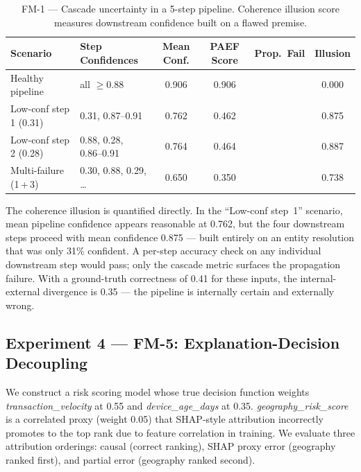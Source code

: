 \documentclass{article}
\newcommand{\yes}{\ding{51}}     %
\newcommand{\no}{\ding{55}}      %
\begin{document}
\begin{table}[t]
  \centering
  \caption{FM-1 --- Cascade uncertainty in a 5-step pipeline.  Coherence
    illusion score measures downstream confidence built on a flawed premise.}
  \label{tab:exp-fm1}
  \small
  \renewcommand{\arraystretch}{1.2}
  \begin{tabularx}{\textwidth}{lXcccc}
    \toprule
    \textbf{Scenario} & \textbf{Step Confidences} & \textbf{Mean Conf.} & \textbf{PAEF Score} & \textbf{Prop.\ Fail} & \textbf{Illusion} \\
    \midrule
    Healthy pipeline       & all $\geq 0.88$            & 0.906 & 0.906 & \no  & 0.000 \\
    Low-conf step 1 (0.31) & 0.31, 0.87--0.91           & 0.762 & 0.462 & \yes & 0.875 \\
    Low-conf step 2 (0.28) & 0.88, 0.28, 0.86--0.91     & 0.764 & 0.464 & \yes & 0.887 \\
    Multi-failure (1\,+\,3)& 0.30, 0.88, 0.29, \ldots   & 0.650 & 0.350 & \yes & 0.738 \\
    \bottomrule
  \end{tabularx}
\end{table}

The coherence illusion is quantified directly.  In the ``Low-conf step~1''
scenario, mean pipeline confidence appears reasonable at 0.762, but the
four downstream steps proceed with mean confidence 0.875 --- built entirely
on an entity resolution that was only 31\% confident.  A per-step accuracy
check on any individual downstream step would pass; only the cascade metric
surfaces the propagation failure.  With a ground-truth correctness of 0.41
for these inputs, the internal-external divergence is 0.35 --- the pipeline
is internally certain and externally wrong.

\subsection{Experiment 4 — FM-5: Explanation-Decision Decoupling}
\label{sec:exp-fm5}

We construct a risk scoring model whose true decision function weights
\emph{transaction\_velocity} at 0.55 and \emph{device\_age\_days} at 0.35.
\emph{geography\_risk\_score} is a correlated proxy (weight 0.05) that
SHAP-style attribution incorrectly promotes to the top rank due to feature
correlation in training.  We evaluate three attribution orderings: causal
(correct ranking), SHAP proxy error (geography ranked first), and partial
error (geography ranked second).
\end{document}

